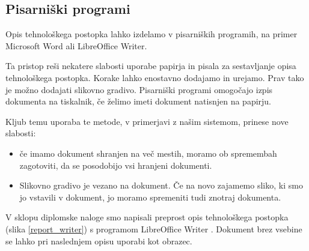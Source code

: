 \documentclass[a4paper, 12pt]{book}
\begin{document}

\subsection{Pisarniški programi}

Opis tehnološkega postopka lahko izdelamo v pisarniških programih, na primer Microsoft Word ali LibreOffice Writer.

Ta pristop reši nekatere slabosti uporabe papirja in pisala za sestavljanje opisa tehnološkega postopka.
Korake lahko enostavno dodajamo in urejamo.
Prav tako je možno dodajati slikovno gradivo.
Pisarniški programi omogočajo izpis dokumenta na tiskalnik, če želimo imeti dokument natisnjen na papirju.

Kljub temu uporaba te metode, v primerjavi z našim sistemom, prinese nove slabosti:
\begin{itemize}
	\item če imamo dokument shranjen na več mestih, moramo ob spremembah zagotoviti, da se posodobijo vsi hranjeni dokumenti.
	\item Slikovno gradivo je vezano na dokument. Če na novo zajamemo sliko, ki smo jo vstavili v dokument, jo moramo spremeniti tudi znotraj dokumenta.
\end{itemize}

V sklopu diplomske naloge smo napisali preprost opis tehnološkega postopka (slika \ref{report_writer}) s programom LibreOffice Writer \cite{writer}.
Dokument brez vsebine se lahko pri naslednjem opisu uporabi kot obrazec.
\end{document}
